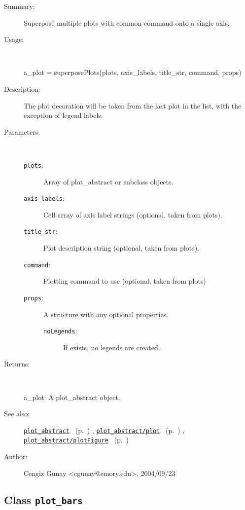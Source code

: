 \begin{description}
\item[Summary:]Superpose multiple plots with common command onto a single axis.
%
\item[Usage:]~%
\begin{lyxcode}%
a\_plot = superposePlots(plots, axis\_labels, title\_str, command, props)
%
\end{lyxcode}%
%
\item[Description:]%
The plot decoration will be taken from the last plot in the list, 
 with the exception of legend labels.
\item[Parameters:]~
\begin{description}%
\item[\texttt{plots}:]
 Array of plot\_abstract or subclass objects.
\item[\texttt{axis\_labels}:]
 Cell array of axis label strings (optional, taken from plots).
\item[\texttt{title\_str}:]
 Plot description string (optional, taken from plots).
\item[\texttt{command}:]
 Plotting command to use (optional, taken from plots)
\item[\texttt{props}:]
 A structure with any optional properties.
\begin{description}%
\item[\texttt{noLegends}:]
 If exists, no legends are created.
\end{description}%
\end{description}%
%
\item[Returns:
]~

	a\_plot: A plot\_abstract object.
%
%
\item[See also:]%
\hyperlink{ref_plot_abstract}{\texttt{plot\_abstract}}%
\ (p.~\pageref{ref_plot_abstract})%
%
, \hyperlink{ref_plot_abstract__plot}{\texttt{plot\_abstract/plot}}%
\ (p.~\pageref{ref_plot_abstract__plot})%
%
, \hyperlink{ref_plot_abstract__plotFigure}{\texttt{plot\_abstract/plotFigure}}%
\ (p.~\pageref{ref_plot_abstract__plotFigure})%
%
%
\item[Author:]%
Cengiz Gunay <cgunay@emory.edu>, 2004/09/23
%
\end{description}
\methodline%
\subsection{Class \texttt{plot\_bars}}%
%
\label{ref_plot_bars}%
\hypertarget{ref_plot_bars}{}%
